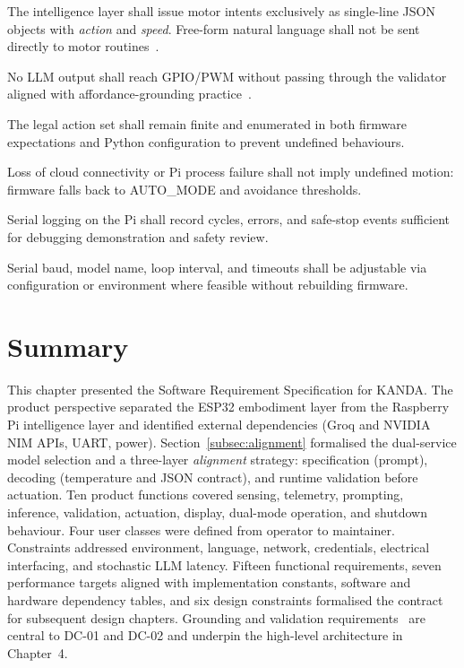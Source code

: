\begin{description}[style=nextline]
  \item[Structured Commands Only] The intelligence layer shall issue motor intents exclusively as single-line JSON objects with \textit{action} and \textit{speed}. Free-form natural language shall not be sent directly to motor routines~\cite{vemprala2024chatgpt}.

  \item[Validation Before Motion] No LLM output shall reach GPIO/PWM without passing through the validator aligned with affordance-grounding practice~\cite{ahn2022saycan,huang2023grounded}.

  \item[Bounded Action Space] The legal action set shall remain finite and enumerated in both firmware expectations and Python configuration to prevent undefined behaviours.

  \item[Graceful Degradation] Loss of cloud connectivity or Pi process failure shall not imply undefined motion: firmware falls back to AUTO\_MODE and avoidance thresholds.

  \item[Observability] Serial logging on the Pi shall record cycles, errors, and safe-stop events sufficient for debugging demonstration and safety review.

  \item[Configurability Without Reflash (Pi)] Serial baud, model name, loop interval, and timeouts shall be adjustable via configuration or environment where feasible without rebuilding firmware.
\end{description}

\section{Summary}
\label{sec:ch3summary}

This chapter presented the Software Requirement Specification for KANDA. The product perspective separated the ESP32 embodiment layer from the Raspberry Pi intelligence layer and identified external dependencies (Groq and NVIDIA NIM APIs, UART, power). Section~\ref{subsec:alignment} formalised the dual-service model selection and a three-layer \textit{alignment} strategy: specification (prompt), decoding (temperature and JSON contract), and runtime validation before actuation. Ten product functions covered sensing, telemetry, prompting, inference, validation, actuation, display, dual-mode operation, and shutdown behaviour. Four user classes were defined from operator to maintainer. Constraints addressed environment, language, network, credentials, electrical interfacing, and stochastic LLM latency. Fifteen functional requirements, seven performance targets aligned with implementation constants, software and hardware dependency tables, and six design constraints formalised the contract for subsequent design chapters. Grounding and validation requirements~\cite{ahn2022saycan,huang2023grounded,vemprala2024chatgpt} are central to DC-01 and DC-02 and underpin the high-level architecture in Chapter~4.
